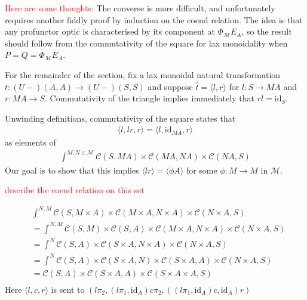 \documentclass[11pt,a4paper]{article}
\makeatletter
\theoremstyle{plain}
\newtheorem{proposition}[theorem]{Proposition}
\theoremstyle{definition}
\newcommand{\C}{\mathscr{C}}
\newcommand{\M}{\mathscr{M}}
\newcommand{\Pastro}{\Phi}
\newcommand{\Set}{\mathbf{Set}}
\newcommand{\id}{\mathrm{id}}
\newcommand{\hto}{\ensuremath{\,\mathaccent\shortmid\rightarrow\,}}
\providecommand{\leftsquigarrow}{%
  \mathrel{\mathpalette\reflect@squig\relax}%
}
\newcommand{\reflect@squig}[2]{%
  \reflectbox{$\m@th#1\rightsquigarrow$}%
}
\newcommand{\todo}[1]{\textcolor{red}{\small #1}}
\makeatother
\begin{document}

\todo{Here are some thoughts:}
The converse is more difficult, and unfortunately requires another fiddly proof by induction on the coend relation. The idea is that any profunctor optic is characterised by its component at $\Pastro_\M E_A$, so the result should follow from the commutativity of the square for lax monoidality when $P = Q = \Pastro_\M E_A$.

For the remainder of the section, fix a lax monoidal natural transformation $t : (U-)(A,A) \to (U-)(S,S)$ and suppose $\hat{t} = \langle l, r \rangle$ for $l : S \to MA$ and $r : MA \to S$. Commutativity of the triangle implies immediately that $rl = \id_S$.

Unwinding definitions, commutativity of the square states that
\begin{align*}
\langle l, lr, r \rangle = \langle l, \id_{MA}, r \rangle
\end{align*}
as elements of 
\begin{align*}
\int^{M,N\in \M} \C(S, MA) \times \C(MA, NA) \times \C(NA, S)
\end{align*}
Our goal is to show that this implies $\langle lr \rangle = \langle \phi A \rangle$ for some $\phi : M \to M$ in $\M$.

\todo{describe the coend relation on this set}

\newcommand{\rightrightsquigarrow}{\mathrel{\substack{\textstyle\rightsquigarrow\\[-0.6ex]
                      \textstyle\rightsquigarrow}}}
\newcommand{\leftleftsquigarrow}{\mathrel{\substack{\textstyle\leftsquigarrow\\[-0.6ex]
                      \textstyle\leftsquigarrow}}}

\begin{align*}
&\int^{N,M} \C(S, M \times A) \times \C(M \times A, N \times A) \times \C(N \times A, S) \\
&= \int^{N,M} \C(S, M) \times \C(S, A) \times \C(M \times A, N \times A) \times \C(N \times A, S) \\
&= \int^{N} \C(S, A) \times \C(S \times A, N \times A) \times \C(N \times A, S) \\
&= \int^{N} \C(S, A) \times \C(S \times A, N) \times \C(S \times A, A) \times \C(N \times A, S) \\
&= \C(S, A) \times \C(S \times A, A) \times \C(S \times A \times A, S) \\
\end{align*}
Here $\langle l, c, r \rangle$ is sent to $(l \pi_2, (l \pi_1, \id_A) c \pi_2, ((l \pi_1, \id_A) c, \id_A) r)$
\end{document}

